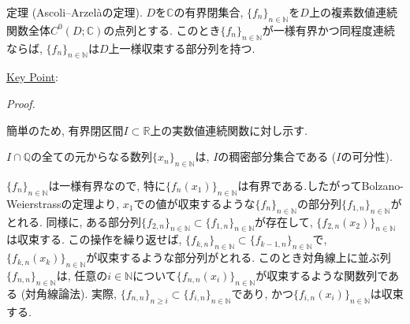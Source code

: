 \documentclass{jsarticle}
\newcommand{\R}{\mathbb{R}}%
\newcommand{\C}{\mathbb{C}}%
\renewenvironment{proof}[1][Proof]{%
\begin{proofbox}%
\textit{#1. }\ignorespaces
}{%
\hfill\qedsymbol%
\end{proofbox}%
}
\begin{document}
\begin{thm}{定理 (Ascoli–Arzelàの定理).}
$D$を$\C$の有界閉集合, $\{f_n\}_{n\in\mathbb{N}}$を$D$上の複素数値連続関数全体$C^{0}(D;\C)$の点列とする. このとき$\{f_n\}_{n\in\mathbb{N}}$が一様有界かつ同程度連続ならば, $\{f_n\}_{n\in\mathbb{N}}$は$D$上一様収束する部分列を持つ.
\end{thm}
\uline{Key Point}$\colon$
\begin{proof}
簡単のため, 有界閉区間$I\subset\R$上の実数値連続関数に対し示す.

$I\cap\mathbb{Q}$の全ての元からなる数列$\{x_n\}_{n\in\mathbb{N}}$は, $I$の稠密部分集合である ($I$の可分性).

\indent$\{f_n\}_{n\in\mathbb{N}}$は一様有界なので, 特に$\{f_{n}(x_{1})\}_{n\in\mathbb{N}}$は有界である.したがってBolzano-Weierstrassの定理より, $x_1$での値が収束するような$\{f_n\}_{n\in\mathbb{N}}$の部分列$\{f_{1,n}\}_{n\in\mathbb{N}}$がとれる. 同様に, ある部分列$\{f_{2,n}\}_{n\in\mathbb{N}}\subset\{f_{1,n}\}_{n\in\mathbb{N}}$が存在して, $\{f_{2,n}(x_2)\}_{n\in\mathbb{N}}$は収束する. この操作を繰り返せば, $\{f_{k,n}\}_{n\in\mathbb{N}}\subset\{f_{k-1,n}\}_{n\in\mathbb{N}}$で, $\{f_{k,n}(x_{k})\}_{n\in\mathbb{N}}$が収束するような部分列がとれる. このとき対角線上に並ぶ列$\{f_{n,n}\}_{n\in\mathbb{N}}$は, 任意の$i\in\mathbb{N}$について$\{f_{n,n}(x_i)\}_{n\in\mathbb{N}}$が収束するような関数列である (対角線論法). 実際, $\{f_{n,n}\}_{n\ge i}\subset\{f_{i,n}\}_{n\in\mathbb{N}}$であり, かつ$\{f_{i,n}(x_i)\}_{n\in\mathbb{N}}$は収束する.

\vspace{1em}
\begin{center}
\end{center}
\end{proof}
\end{document}

